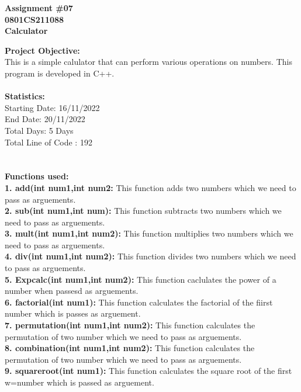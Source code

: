 \documentclass[11pt]{article}
\begin{document}
\begin{center}
\textbf{Assignment \#07}\\
\textbf{0801CS211088}\\
\vspace{.5cm}
\textbf{\huge Calculator}\\ 
\end{center}
\vspace{.5cm}
\textbf{ \large Project Objective: } \\
This is a simple calulator that can perform various operations on numbers. This program is developed in C++.
\\ \\
\textbf{ \large Statistics: } \\ 
Starting Date: 16/11/2022 \\
End Date: 20/11/2022  \\
Total Days: 5 Days \\
Total Line of Code : 192 \\ \\ \\
\textbf{ \large Functions used: } \\
\textbf{1. add(int num1,int num2:} This function adds two numbers which we need to pass as arguements. \\ 
\textbf{2. sub(int num1,int num):}  This function subtracts two numbers which we need to pass as arguements. \\
\textbf{3. mult(int num1,int num2):} This function multiplies two numbers which we need to pass as arguements. \\
\textbf{4. div(int num1,int num2):} This function divides two numbers which we need to pass as arguements.  \\
\textbf{5. Expcalc(int num1,int num2):} This function caclulates the power of a  number when passesd as arguements. \\
\textbf{6. factorial(int num1):} This function calculates the factorial of the fiirst number which is passes as arguement. \\
\textbf{7. permutation(int num1,int num2):} This function calculates the permutation of two number which we need to pass as arguements. \\
\textbf{8. combination(int num1,int num2):} This function calculates the permutation of two number which we need to pass as arguements. \\
\textbf{9. squareroot(int num1):} This function calculates the square root of the first w=number which is passed as arguement. \\
\end{document}
